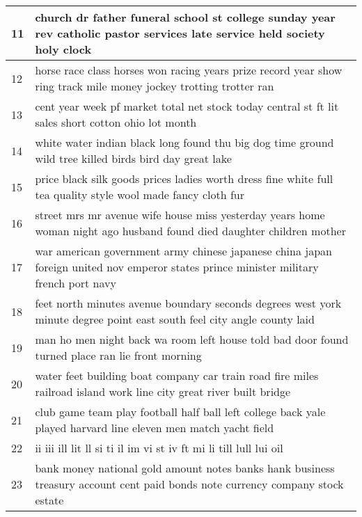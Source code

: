 \begin{table}
{\begin{tabular}{|p{1cm}|p{16cm}|}
    11       & church dr father funeral school st college sunday year rev catholic pastor services late service held society holy clock                              \\ \hline
    12       & horse race class horses won racing years prize record year show ring track mile money jockey trotting trotter ran                                     \\ \hline
    13       & cent year week pf market total net stock today central st ft lit sales short cotton ohio lot month                                                    \\ \hline
    14       & white water indian black long found thu big dog time ground wild tree killed birds bird day great lake                                                \\ \hline
    15       & price black silk goods prices ladies worth dress fine white full tea quality style wool made fancy cloth fur                                          \\ \hline
    16       & street mrs mr avenue wife house miss yesterday years home woman night ago husband found died daughter children mother                                 \\ \hline
    17       & war american government army chinese japanese china japan foreign united nov emperor states prince minister military french port navy                 \\ \hline
    18       & feet north minutes avenue boundary seconds degrees west york minute degree point east south feel city angle county laid                               \\ \hline
    19       & man ho men night back wa room left house told bad door found turned place ran lie front morning                                                       \\ \hline
    20       & water feet building boat company car train road fire miles railroad island work line city great river built bridge                                    \\ \hline
    21       & club game team play football half ball left college back yale played harvard line eleven men match yacht field                                        \\ \hline
    22       & ii iii ill lit ll si ti il im vi st iv ft mi li till lull lui oil                                                                                     \\ \hline
    23       & bank money national gold amount notes banks hank business treasury account cent paid bonds note currency company stock estate                         \\ \hline

\end{tabular}}
\end{table}
